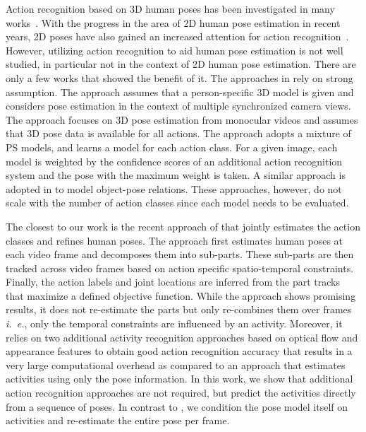 \documentclass[a4paper, 10pt, conference]{ieeeconf}      \usepackage{FG2017}
\newcommand{\ie}{\mbox{\emph{i. e.}}}
\begin{document}
Action recognition based on 3D human poses has been investigated in many works~\cite{ye2013survey}. With the progress in the area of 2D human pose estimation in recent years, 2D poses have also gained an increased attention for action recognition~\cite{YangWM10, singh_iccv2011action, desai_eccv2012, Jhuang_iccv2013, pishculin_gcpr2014, cheron2015p}. However, utilizing action recognition to aid human pose estimation is not well studied, in particular not in the context of 2D human pose estimation. There are only a few works \cite{yao_ijcv2012,Yu_cvpr2013,ukita2013iterative,Bangpeng_TPAMI2012,bruce_cvpr2015} that showed the benefit of it. The approaches in \cite{yao_ijcv2012,Yu_cvpr2013} rely on strong assumption.   
The approach \cite{yao_ijcv2012} assumes that a person-specific 3D model is given and considers pose estimation in the context of multiple synchronized camera views. The approach \cite{Yu_cvpr2013} focuses on 3D pose estimation from monocular videos and assumes that 3D pose data is available for all actions. 
The approach \cite{ukita2013iterative} adopts a mixture of PS models, and learns a model for each action class. For a given image, each model is weighted by the confidence scores of an additional action recognition system and the pose with the maximum weight is taken. A similar approach is adopted in \cite{Bangpeng_TPAMI2012} to model object-pose relations. These approaches, however, do not scale with the number of action classes since each model needs to be evaluated. 

The closest to our work is the recent approach of \cite{bruce_cvpr2015} that jointly estimates the action classes and refines human poses. The approach first estimates human poses at each video frame and decomposes them into sub-parts. These sub-parts are then tracked across video frames based on action specific spatio-temporal constraints. Finally, the action labels and joint locations are inferred from the part tracks that maximize a defined objective function. While the approach shows promising results, it does not re-estimate the parts but only re-combines them over frames \ie , only the temporal constraints are influenced by an activity. Moreover, it relies on two additional activity recognition approaches based on optical flow and appearance features to obtain good action recognition accuracy that results in a very large computational overhead as compared to an approach that estimates activities using only the pose information. In this work, we show that additional action recognition approaches are not required, but predict the activities directly from a sequence of poses. In contrast to \cite{bruce_cvpr2015}, we condition the pose model itself on activities and re-estimate the entire pose per frame.
\end{document}
